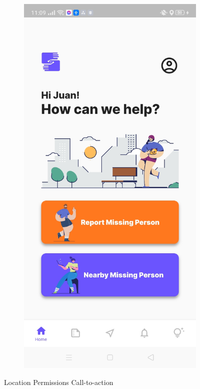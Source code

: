 \begin{figure}[!h]
\begin{subfigure}[c]{0.30\linewidth}
    \end{subfigure}
    \centering
    \begin{subfigure}[c]{0.30\linewidth}
        \centering
        \includegraphics[scale=0.15]{figures/Chapter4/Main/Home.jpg}
    \end{subfigure}
    \caption{Location Permissions Call-to-action}
    \label{fig:locationPermission}
\end{figure}


